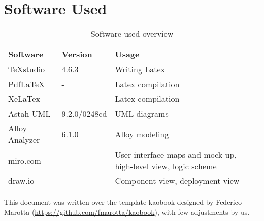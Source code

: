 \chapter{Software Used}
\begin{center}
	\begin{table}[H]
		\begin{tabular}{ | m{3cm} | m{3cm} | m{3cm} | } 
			\hline
			\textbf {Software} & \textbf{Version} & \textbf{Usage} \\
			\hline
			TeXstudio & 4.6.3 & Writing Latex \\
			\hline
			PdfLaTeX & - & Latex compilation \\
			\hline
			XeLaTex & - & Latex compilation \\
			\hline
			Astah UML & 9.2.0/0248cd & UML diagrams \\
			\hline
			Alloy Analyzer & 6.1.0 & Alloy modeling \\
			\hline
			miro.com & - & User interface maps and mock-up, high-level view, logic scheme \\
			draw.io & - & Component view, deployment view
		\end{tabular}
		\caption{Software used overview}
	\end{table}
\end{center}

This document was written over the template kaobook designed by Federico Marotta (\url{https://github.com/fmarotta/kaobook}), with few adjustments by us.